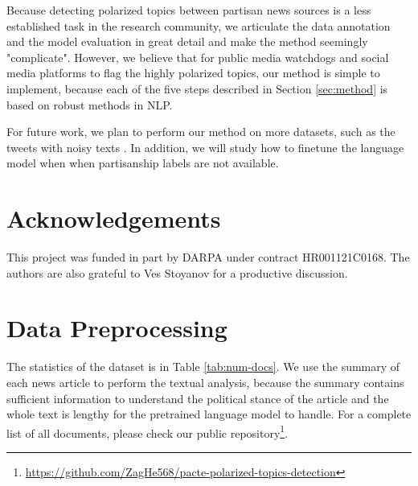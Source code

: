 \documentclass[11pt]{article}
\begin{document}
Because detecting polarized topics between partisan news sources is a less established task in the research community, we articulate the data annotation and the model evaluation in great detail and make the method seemingly "complicate". However, we believe that for public media watchdogs and social media platforms to flag the highly polarized topics, our method is simple to implement, because each of the five steps described in Section \ref{sec:method} is based on robust methods in NLP. 

For future work, we plan to perform our method on more datasets, such as the tweets with noisy texts \cite{demszky2019analyzing}. In addition, we will study how to finetune the language model when when partisanship labels are not available. 

\section*{Acknowledgements}
This project was funded in part by DARPA under contract HR001121C0168. The authors are also grateful to Ves Stoyanov for a productive discussion.






\clearpage
\appendix


\section{Data Preprocessing}
The statistics of the dataset is in Table \ref{tab:num-docs}. We use the summary of each news article to perform the textual analysis, because the summary contains sufficient information to understand the political stance of the article and the whole text is lengthy for the pretrained language model to handle. 
For a complete list of all documents, please check our public repository\footnote{\url{https://github.com/ZagHe568/pacte-polarized-topics-detection}}.
\end{document}
